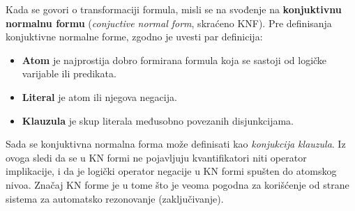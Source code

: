 Kada se govori o transformaciji formula, misli se na svođenje na \textbf{konjuktivnu normalnu formu} (\textit{conjuctive normal form}, skraćeno KNF). Pre definisanja konjuktivne normalne forme, zgodno je uvesti par definicija:
\begin{itemize}
\item \textbf{Atom} je najprostija dobro formirana formula koja se sastoji od logičke varijable ili predikata.
\item \textbf{Literal} je atom ili njegova negacija.
\item \textbf{Klauzula} je skup literala međusobno povezanih disjunkcijama.
\end{itemize}
Sada se konjuktivna normalna forma može definisati kao \emph{konjukcija klauzula}. Iz ovoga sledi da se u KN formi ne pojavljuju kvantifikatori niti operator implikacije, i da je logički operator negacije u KN formi spušten do atomskog nivoa. Značaj KN forme je u tome što je veoma pogodna za korišćenje od strane sistema za automatsko rezonovanje (zaključivanje).

